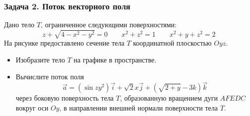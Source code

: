 \begin{frame}
\frametitle{Задача 2. Поток векторного поля}
Дано тело $T$, ограниченное следующими поверхностями:
\[
  z + \sqrt{4 - x^2 - y^2} = 0 \qquad x^2+z^2 = 1 \qquad x^2 + y + z^2 = 2
\]
На рисунке предоставлено сечение тела $T$ координатной плоскостью
$Oyz$.

\begin{itemize}
\item Изобразите тело $T$ на графике в пространстве.
\item Вычислите поток поля
\[
  \vec a = (\sin zy^2) \vec i + \sqrt{2} x \vec j + (\sqrt{2+y} -3k) \vec k
\]
через боковую поверхность тела $T$, образованную вращением дуги $AFEDC$ 
вокруг оси $Oy$, в направлении внешней нормали поверхности тела $T$.
\end{itemize}

\end{frame}
